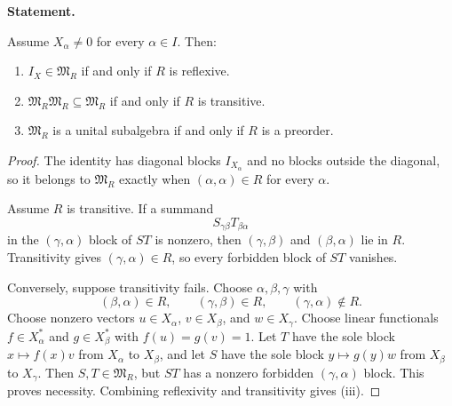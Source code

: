 \label{rec:PSC-I-T-SUPPORT-PATTERN-ALGEBRA}
\textbf{Statement.}\par
Assume $X_\alpha\neq0$ for every $\alpha\in I$.  Then:
\begin{enumerate}[label=(\roman*)]
\item $I_X\in\mathfrak M_R$ if and only if $R$ is reflexive.
\item $\mathfrak M_R\mathfrak M_R\subseteq\mathfrak M_R$ if and only if $R$ is transitive.
\item $\mathfrak M_R$ is a unital subalgebra if and only if $R$ is a preorder.
\end{enumerate}

\begin{proof}
The identity has diagonal blocks $I_{X_\alpha}$ and no blocks outside the diagonal, so it belongs to $\mathfrak M_R$ exactly when $(\alpha,\alpha)\in R$ for every $\alpha$.

Assume $R$ is transitive.  If a summand
\[
S_{\gamma\beta}T_{\beta\alpha}
\]
in the $(\gamma,\alpha)$ block of $ST$ is nonzero, then $(\gamma,\beta)$ and $(\beta,\alpha)$ lie in $R$.  Transitivity gives $(\gamma,\alpha)\in R$, so every forbidden block of $ST$ vanishes.

Conversely, suppose transitivity fails.  Choose $\alpha,\beta,\gamma$ with
\[
(\beta,\alpha)\in R,
\qquad
(\gamma,\beta)\in R,
\qquad
(\gamma,\alpha)\notin R.
\]
Choose nonzero vectors $u\in X_\alpha$, $v\in X_\beta$, and $w\in X_\gamma$.  Choose linear functionals $f\in X_\alpha^*$ and $g\in X_\beta^*$ with $f(u)=g(v)=1$.  Let $T$ have the sole block $x\mapsto f(x)v$ from $X_\alpha$ to $X_\beta$, and let $S$ have the sole block $y\mapsto g(y)w$ from $X_\beta$ to $X_\gamma$.  Then $S,T\in\mathfrak M_R$, but $ST$ has a nonzero forbidden $(\gamma,\alpha)$ block.  This proves necessity.  Combining reflexivity and transitivity gives (iii).
\end{proof}

